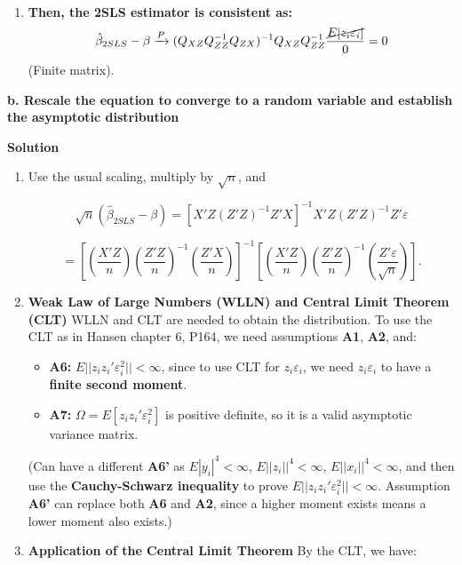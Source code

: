\documentclass[12pt, oneside]{article}
\begin{document}
\begin{enumerate}
 \item \textbf*{Then, the 2SLS estimator is consistent as:}
\[
\hat{\beta}_{2SLS} - \beta \xrightarrow{P} (Q_{XZ} Q_{ZZ}^{-1} Q_{ZX})^{-1} Q_{XZ} Q_{ZZ}^{-1} \frac{\cancel{E[z_i \varepsilon_i]}}{0} = 0
\]
(Finite matrix).

\end{enumerate}


\textbf{b. Rescale the equation to converge to a random variable and establish the asymptotic distribution}

\textbf*{Solution}
\begin{enumerate}
    \item Use the usual scaling, multiply by \( \sqrt{n} \), and

\[
\sqrt{n}(\hat{\beta}_{2SLS} - \beta) = [X'Z(Z'Z)^{-1}Z'X]^{-1} X'Z(Z'Z)^{-1}Z'\varepsilon
\]

\[
= \left[ \left(\frac{X'Z}{n}\right) \left(\frac{Z'Z}{n}\right)^{-1} \left(\frac{Z'X}{n}\right) \right]^{-1} 
\left[ \left(\frac{X'Z}{n}\right) \left(\frac{Z'Z}{n}\right)^{-1} \left(\frac{Z'\varepsilon}{\sqrt{n}}\right) \right].
\]

\item \textbf{Weak Law of Large Numbers (WLLN) and Central Limit Theorem (CLT)}
WLLN and CLT are needed to obtain the distribution. To use the CLT as in Hansen chapter 6, P164, we need assumptions \textbf{A1}, \textbf{A2}, and:

\begin{itemize}
    \item \textbf{A6:} \( E||z_i z_i' \varepsilon_i^2|| < \infty \), since to use CLT for \( z_i \varepsilon_i \), we need \( z_i \varepsilon_i \) to have a \textbf{finite second moment}.
    \item \textbf{A7:} \( \Omega = E[z_i z_i' \varepsilon_i^2] \) is positive definite, so it is a valid asymptotic variance matrix.
\end{itemize}

(Can have a different \textbf{A6'} as \( E|y_i|^4 < \infty \), \( E||z_i||^4 < \infty \), \( E||x_i||^4 < \infty \), and then use the \textbf{Cauchy-Schwarz inequality} to prove \( E||z_i z_i' \varepsilon_i^2|| < \infty \). Assumption \textbf{A6'} can replace both \textbf{A6} and \textbf{A2}, since a higher moment exists means a lower moment also exists.)

\item \textbf{Application of the Central Limit Theorem}
By the CLT, we have:


\end{enumerate}
\end{document}
